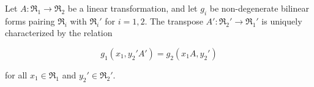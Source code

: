Let $A: \mathfrak{R}_1 \to \mathfrak{R}_2$ be a linear transformation, and let $g_i$ be non-degenerate bilinear forms pairing $\mathfrak{R}_i$ with $\mathfrak{R}_i'$ for $i = 1, 2$. The transpose $A': \mathfrak{R}_2' \to \mathfrak{R}_1'$ is uniquely characterized by the relation

$$g_1(x_1, y_2' A') = g_2(x_1 A, y_2')$$

for all $x_1 \in \mathfrak{R}_1$ and $y_2' \in \mathfrak{R}_2'$.

